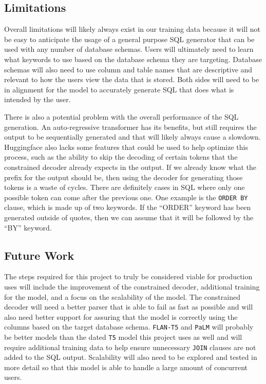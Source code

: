 \documentclass[11pt]{article}
\begin{document}
\subsection{Limitations}

Overall limitations will likely always exist in our training data because it will not be easy to anticipate the usage of a general purpose SQL generator that can be used with any number of database schemas. Users will ultimately need to learn what keywords to use based on the database schema they are targeting. Database schemas will also need to use column and table names that are descriptive and relevant to how the users view the data that is stored. Both sides will need to be in alignment for the model to accurately generate SQL that does what is intended by the user.

There is also a potential problem with the overall performance of the SQL generation. An auto-regressive transformer has its benefits, but still requires the output to be sequentially generated and that will likely always cause a slowdown. Huggingface \cite{wolf2020huggingfaces} also lacks some features that could be used to help optimize this process, such as the ability to skip the decoding of certain tokens that the constrained decoder already expects in the output. If we already know what the prefix for the output should be, then using the decoder for generating those tokens is a waste of cycles. There are definitely cases in SQL where only one possible token can come after the previous one. One example is the \texttt{ORDER BY} clause, which is made up of two keywords. If the ``ORDER'' keyword has been generated outside of quotes, then we can assume that it will be followed by the ``BY'' keyword.

\subsection{Future Work}

The steps required for this project to truly be considered viable for production uses will include the improvement of the constrained decoder, additional training for the model, and a focus on the scalability of the model. The constrained decoder will need a better parser that is able to fail as fast as possible and will also need better support for assuring that the model is correctly using the columns based on the target database schema. \texttt{FLAN-T5} \citep{chung2022scaling} and \texttt{PaLM} \citep{chowdhery2022palm} will probably be better models than the dated \texttt{T5} model this project uses as well and will require additional training data to help ensure unnecessary \texttt{JOIN} clauses are not added to the SQL output. Scalability will also need to be explored and tested in more detail so that this model is able to handle a large amount of concurrent users.
\end{document}
